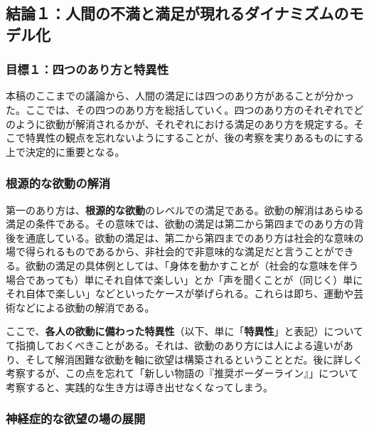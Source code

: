 \subsection{結論１：人間の不満と満足が現れるダイナミズムのモデル化}\label{ux7d50ux8ad6uxff11ux4ebaux9593ux306eux4e0dux6e80ux3068ux6e80ux8db3ux304cux73feux308cux308bux30c0ux30a4ux30caux30dfux30baux30e0ux306eux30e2ux30c7ux30ebux5316}

\subsubsection{目標１：四つのあり方と特異性}\label{ux76eeux6a19uxff11ux56dbux3064ux306eux3042ux308aux65b9ux3068ux7279ux7570ux6027}

本稿のここまでの議論から、人間の満足には四つのあり方があることが分かった。ここでは、その四つのあり方を総括していく。四つのあり方のそれぞれでどのように欲動が解消されるかが、それぞれにおける満足のあり方を規定する。そこで特異性の観点を忘れないようにすることが、後の考察を実りあるものにする上で決定的に重要となる。

\subsubsection{根源的な欲動の解消}\label{ux6839ux6e90ux7684ux306aux6b32ux52d5ux306eux89e3ux6d88}

第一のあり方は、\textbf{根源的な欲動}のレベルでの満足である。欲動の解消はあらゆる満足の条件である。その意味では、欲動の満足は第二から第四までのあり方の背後を通底している。欲動の満足は、第二から第四までのあり方は社会的な意味の場で得られるものであるから、非社会的で非意味的な満足だと言うことができる。欲動の満足の具体例としては、「身体を動かすことが（社会的な意味を伴う場合であっても）単にそれ自体で楽しい」とか「声を聞くことが（同じく）単にそれ自体で楽しい」などといったケースが挙げられる。これらは即ち、運動や芸術などによる欲動の解消である。

ここで、\textbf{各人の欲動に備わった特異性}（以下、単に「\textbf{特異性}」と表記）についてて指摘しておくべきことがある。それは、欲動のあり方には人による違いがあり、そして解消困難な欲動を軸に欲望は構築されるということとだ。後に詳しく考察するが、この点を忘れて「新しい物語の『推奨ボーダーライン』」について考察すると、実践的な生き方は導き出せなくなってしまう。

\subsubsection{神経症的な欲望の場の展開}\label{ux795eux7d4cux75c7ux7684ux306aux6b32ux671bux306eux5834ux306eux5c55ux958b}


